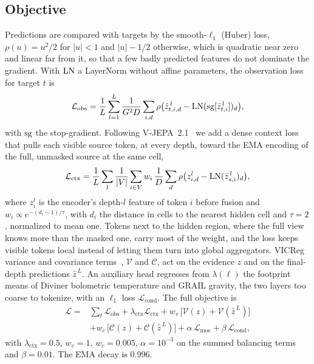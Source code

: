 \subsection{Objective}
\label{sec:objective}

Predictions are compared with targets by the smooth-$\ell_1$ (Huber) loss, $\rho(u) = u^2/2$ for $|u| < 1$ and $|u| - 1/2$ otherwise, which is quadratic near zero and linear far from it, so that a few badly predicted features do not dominate the gradient. With $\operatorname{LN}$ a LayerNorm without affine parameters, the observation loss for target $t$ is
\begin{equation}
  \mathcal{L}_{\text{obs}} = \frac{1}{L}\sum_{l=1}^{L} \frac{1}{G^2 D}\sum_{i,d}
  \rho\big(\hat z^{\,l}_{t,i,d} - \operatorname{LN}(\operatorname{sg}[\bar z^{\,l}_{t,i}])_d\big),
  \label{eq:cm}
\end{equation}
with $\operatorname{sg}$ the stop-gradient. Following V-JEPA~2.1~\cite{murlabadia2026vjepa} we add a dense context loss that pulls each visible source token, at every depth, toward the EMA encoding of the full, unmasked source at the same cell,
\begin{equation}
  \mathcal{L}_{\text{ctx}} = \frac{1}{L}\sum_{l} \frac{1}{|V|}\sum_{i\in V} w_i\, \frac{1}{D}\sum_d \rho\big(z^{l}_{i,d} - \operatorname{LN}(\bar z^{\,l}_{s,i})_d\big),
  \label{eq:ctx}
\end{equation}
where $z^{l}_i$ is the encoder's depth-$l$ feature of token $i$ before fusion and $w_i \propto e^{-(d_i-1)/\tau}$, with $d_i$ the distance in cells to the nearest hidden cell and $\tau{=}2$, normalized to mean one. Tokens next to the hidden region, where the full view knows more than the masked one, carry most of the weight, and the loss keeps visible tokens local instead of letting them turn into global aggregators. VICReg variance and covariance terms~\cite{bardes2022vicreg}, $\mathcal{V}$ and $\mathcal{C}$, act on the evidence $z$ and on the final-depth predictions $\hat z^{\,L}$. An auxiliary head regresses from $\lambda(\ell)$ the footprint means of Diviner bolometric temperature and GRAIL gravity, the two layers too coarse to tokenize, with an $\ell_1$ loss $\mathcal{L}_{\text{cond}}$. The full objective is
\begin{equation}
  \begin{aligned}
  \mathcal{L} = {} & \sum_t \mathcal{L}_{\text{obs}} + \lambda_{\text{ctx}}\mathcal{L}_{\text{ctx}}
  + w_v\,\big[\mathcal{V}(z) + \mathcal{V}(\hat z^{\,L})\big] \\
  & + w_c\,\big[\mathcal{C}(z) + \mathcal{C}(\hat z^{\,L})\big] + \alpha\,\mathcal{L}_{\text{moe}} + \beta\,\mathcal{L}_{\text{cond}},
  \end{aligned}
  \label{eq:total}
\end{equation}
with $\lambda_{\text{ctx}}{=}0.5$, $w_v{=}1$, $w_c{=}0.005$, $\alpha{=}10^{-3}$ on the summed balancing terms and $\beta{=}0.01$. The EMA decay is 0.996.

